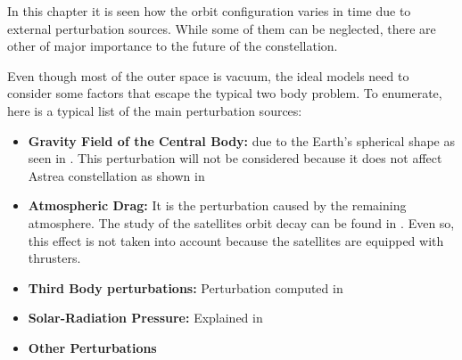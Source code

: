 \label{TypesPerturb}

In this chapter it is seen how the orbit configuration varies in time due to external perturbation sources. While some of them can be neglected, there are other of major importance to the future of the constellation.

Even though most of the outer space is vacuum, the ideal models need to consider some factors that escape the typical two body problem. To enumerate, here is a typical list of the main perturbation sources:

\begin{itemize}
\item \textbf{Gravity Field of the Central Body:} due to the Earth's spherical shape as seen in \cite[Chapter 4, Section 1]{annex1}. This perturbation will not be considered because it does not affect Astrea constellation as shown in \cite[Chapter 4, Section 3]{annex1}
\item \textbf{Atmospheric Drag:} It is the perturbation caused by the remaining atmosphere. The study of the satellites orbit decay can be found in \cite[Chapter 4, Section 3]{annex1}. Even so, this effect is not taken into account because the satellites are equipped with thrusters.
\item \textbf{Third Body perturbations:} Perturbation computed in \cite[Chapter 4, Section 1]{annex1}
\item \textbf{Solar-Radiation Pressure:} Explained in \cite[Chapter 4, Section 3]{annex1}
\item \textbf{Other Perturbations}
\end{itemize}